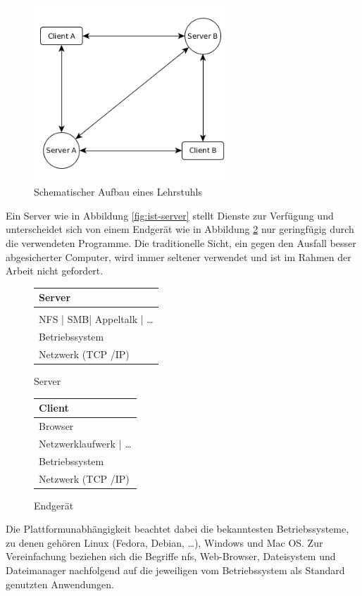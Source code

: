 \documentclass[oneside, ngerman, toc=bibliography,bibliography=totoc,listof=entryprefix, open=right,numbers=noenddot,fontsize=12pt]{scrbook}
\begin{document}
\begin{figure}[htbp] 
	\centering
	\includegraphics[width=0.65\textwidth]{Masterarbeit_Bilder/Lehrstuhl_Datentausch_intern.png}
	\caption{Schematischer Aufbau eines Lehrstuhls}
	\label{fig:ist-struktur2}
\end{figure}  

 Ein Server wie in Abbildung \ref{fig:ist-server} stellt Dienste zur Verfügung und unterscheidet sich von einem Endgerät wie in Abbildung \ref{fig:ist-endgeraet} nur geringfügig durch die verwendeten Programme. Die traditionelle Sicht, ein gegen den Ausfall besser abgesicherter Computer, wird immer seltener verwendet und ist im Rahmen der Arbeit nicht gefordert.
 
\begin{figure}[htbp] 
	\centering 
	\begin{minipage}{.5\textwidth}
	\begin{tabular}{|p{}|}
		\hline
Server\\ \hline\hline
\\
NFS | SMB| Appeltalk | \ldots \\ \hline
Betriebssystem \\ \hline
Netzwerk (TCP /IP) \\ \hline
	\end{tabular}
	 
	\caption{Server}
	\label{fig:ist-server}
\end{minipage}%
\begin{minipage}{.5\textwidth}
	\begin{tabular}{|p{}|}
 		\hline
		Client \\\hline\hline
		Browser \\ \hline
		Netzwerklaufwerk | \ldots \\ \hline
		Betriebssystem \\ \hline
		Netzwerk (TCP /IP) \\ \hline
	\end{tabular}
	\caption{Endgerät}
	\label{fig:ist-endgeraet}
\end{minipage}%
\end{figure}   
Die Plattformunabhängigkeit beachtet dabei die bekanntesten Betriebssysteme, zu denen gehören Linux (Fedora, Debian, \ldots), Windows und Mac OS. Zur Vereinfachung beziehen sich die Begriffe  \acrshort{nfs}, Web-Browser, Dateisystem und Dateimanager nachfolgend auf die jeweiligen vom Betriebssystem als Standard genutzten Anwendungen.
\end{document}
